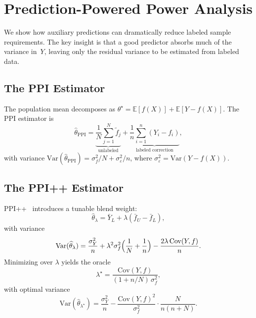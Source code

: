 \documentclass[11pt]{article}
\newcommand{\E}{\mathbb{E}}
\newcommand{\Var}{\mathrm{Var}}
\newcommand{\Cov}{\mathrm{Cov}}
\newcommand{\wh}{\widehat}
\newcommand{\wt}{\widetilde}
\begin{document}
\section{Prediction-Powered Power Analysis}
\label{sec:ppi-power}

We show how auxiliary predictions can dramatically reduce labeled sample
requirements.  The key insight is that a good predictor absorbs much of
the variance in~$Y$, leaving only the residual variance to be estimated
from labeled data.

\subsection{The PPI Estimator}
\label{sec:ppi-vanilla}

The population mean decomposes as
$\theta^\star = \E[f(X)] + \E[Y - f(X)]$.
The PPI estimator is
\begin{equation}\label{eq:ppi-estimator}
\wh\theta_{\mathrm{PPI}} = \underbrace{\frac{1}{N}\sum_{j=1}^N
  \wt f_j}_{\text{unlabeled}} +
  \underbrace{\frac{1}{n}\sum_{i=1}^n (Y_i - f_i)}_{\text{labeled
  correction}},
\end{equation}
with variance
$\Var(\wh\theta_{\mathrm{PPI}}) = \sigma_f^2/N +
\sigma_\varepsilon^2/n$, where
$\sigma_\varepsilon^2 = \Var(Y - f(X))$.

\subsection{The PPI++ Estimator}
\label{sec:ppi++}

PPI++~\citep{angelopoulos2023ppipp} introduces a tunable blend weight:
\begin{equation}\label{eq:ppi++-estimator}
\wh\theta_\lambda = \bar{Y}_L + \lambda(\bar{f}_U - \bar{f}_L),
\end{equation}
with variance
\begin{equation}\label{eq:ppi++-variance}
\Var(\wh\theta_\lambda) = \frac{\sigma_Y^2}{n} +
  \lambda^2 \sigma_f^2 \Bigl(\frac{1}{N}+\frac{1}{n}\Bigr) -
  \frac{2\lambda\,\Cov(Y,f)}{n}.
\end{equation}
Minimizing over $\lambda$ yields the oracle
\begin{equation}\label{eq:lambda-star}
\lambda^\star = \frac{\Cov(Y,f)}{(1 + n/N)\,\sigma_f^2},
\end{equation}
with optimal variance
\begin{equation}\label{eq:ppi++-var-opt}
\Var(\wh\theta_{\lambda^\star}) = \frac{\sigma_Y^2}{n} -
  \frac{\Cov(Y,f)^2}{\sigma_f^2}\cdot\frac{N}{n(n+N)}.
\end{equation}
\end{document}
